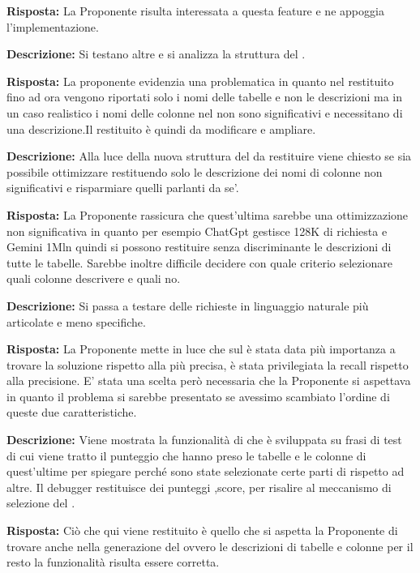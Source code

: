 \par \textbf{Risposta:} La Proponente risulta interessata a questa feature e ne appoggia l’implementazione.
\par \textbf{Descrizione:} Si testano altre  e si analizza la struttura del .

\par \textbf{Risposta:} La proponente evidenzia una problematica in quanto nel  restituito fino ad ora vengono riportati solo i nomi delle tabelle e non le descrizioni ma in un caso realistico i nomi delle colonne nel  non sono significativi e necessitano di una descrizione.Il  restituito è quindi da modificare e ampliare. 
\par \textbf{Descrizione:} Alla luce della nuova struttura del  da restituire viene chiesto se sia possibile ottimizzare restituendo solo le descrizione dei nomi di colonne non significativi e risparmiare quelli parlanti da se’.
\par \textbf{Risposta:} La Proponente rassicura che quest’ultima sarebbe una ottimizzazione non significativa in quanto per esempio ChatGpt gestisce 128K di richiesta e Gemini 1Mln quindi si possono restituire senza discriminante le descrizioni di tutte le tabelle. Sarebbe inoltre difficile decidere con quale criterio selezionare quali colonne descrivere e quali no.

\par \textbf{Descrizione:} Si passa a testare delle richieste in linguaggio naturale più articolate e meno specifiche.

\par \textbf{Risposta:}  La Proponente mette in luce che sul  è stata data più importanza a trovare la soluzione rispetto alla più precisa, è stata privilegiata la recall rispetto alla precisione. E’ stata una scelta però necessaria che la Proponente si aspettava in quanto il problema si sarebbe presentato se avessimo scambiato l’ordine di queste due caratteristiche. 

\par \textbf{Descrizione:} Viene mostrata la funzionalità di  che è sviluppata su frasi di test di cui viene tratto il punteggio che hanno preso le tabelle e le colonne di quest’ultime per spiegare perché sono state selezionate certe parti di  rispetto ad altre. Il debugger restituisce dei punteggi ,score, per risalire al meccanismo di selezione del . 
\par \textbf{Risposta:} Ciò che qui viene restituito è quello che si aspetta la Proponente di trovare anche nella generazione del  ovvero le descrizioni di tabelle e colonne per il resto la funzionalità risulta essere corretta. 



